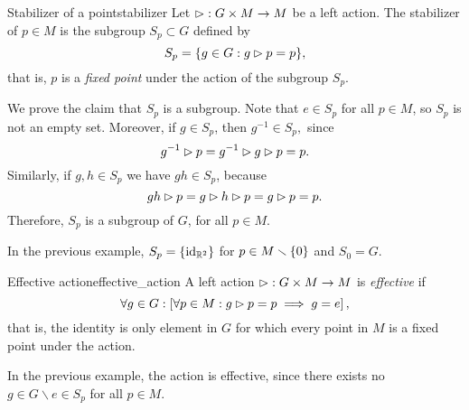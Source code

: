 \begin{definition}{Stabilizer of a point}{stabilizer}
    Let \(\mathbin{\vartriangleright} : G \times M \to M\) be a left action. The stabilizer of \(p \in M\) is the subgroup \(S_p \subset G\) defined by
    \begin{equation*}
        S_p = \{g \in G : g \mathbin{\vartriangleright} p = p\},
    \end{equation*}
    that is, \(p\) is a \emph{fixed point} under the action of the subgroup \(S_p\).
\end{definition}
\begin{remark}
    We prove the claim that \(S_p\) is a subgroup. Note that \(e \in S_p\) for all \(p \in M\), so \(S_p\) is not an empty set. Moreover, if \(g\in S_p\), then \(g^{-1} \in S_p,\) since
    \begin{equation*}
        g^{-1} \mathbin{\vartriangleright} p = g^{-1} \mathbin{\vartriangleright} g \mathbin{\vartriangleright} p = p.
    \end{equation*}
    Similarly, if \(g, h \in S_p\) we have \(gh \in S_p\), because
    \begin{equation*}
        gh \mathbin{\vartriangleright} p = g \mathbin{\vartriangleright} h \mathbin{\vartriangleright} p = g \mathbin{\vartriangleright} p = p.
    \end{equation*}
    Therefore, \(S_p\) is a subgroup of \(G\), for all \(p \in M\).
\end{remark}
\begin{example}
    In the previous example, \(S_p = \{\operatorname{id}_{\mathbb{R}^2}\}\) for \(p \in M \smallsetminus \{0\}\) and \(S_0 = G\).
\end{example}

\begin{definition}{Effective action}{effective_action}
    A left action \(\mathbin{\vartriangleright} : G \times M \to M\) is \emph{effective} if
    \begin{equation*}
        \forall g \in G : \left[\forall p \in M : g \mathbin{\vartriangleright} p = p \implies g = e\right],
    \end{equation*}
    that is, the identity is only element in \(G\) for which every point in \(M\) is a fixed point under the action.
\end{definition}
\begin{example}
    In the previous example, the action is effective, since there exists no \(g \in G \smallsetminus {e} \in S_p\) for all \(p \in M\).
\end{example}

